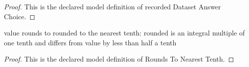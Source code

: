 \begin{proof}
  This is the declared model definition of recorded Dataset Answer Choice.
\end{proof}
\begin{definition}
  \label{def:physics:phyx-mini-0016:phyxminiproblems-problemphyxmini0016-roundstonearesttenth}
  value rounds to rounded to the nearest tenth: rounded is an integral multiple of one tenth and differs from value by less than half a tenth
\end{definition}
\begin{proof}
  This is the declared model definition of Rounds To Nearest Tenth.
\end{proof}
